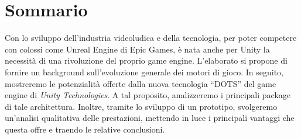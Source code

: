\chapter*{Sommario}




Con lo sviluppo dell'industria videoludica e della tecnologia, per poter competere con colossi come Unreal Engine di Epic Games, è nata anche per Unity la necessità di una rivoluzione del proprio game engine.
L'elaborato si propone di fornire un background sull'evoluzione generale dei motori di gioco. In seguito, mostreremo le potenzialità offerte dalla nuova tecnologia ``DOTS'' del game engine di \emph{Unity Technologies}. A tal proposito, analizzeremo i principali package di tale architettura. Inoltre, tramite lo sviluppo di un prototipo, svolgeremo un'analisi qualitativa delle prestazioni, mettendo in luce i principali vantaggi che questa offre e traendo le relative conclusioni.

